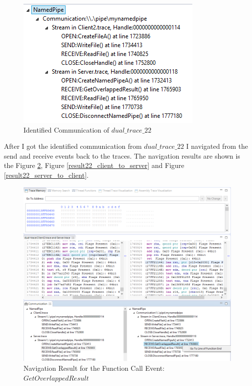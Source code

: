\begin{figure}[H]
\centerline{\includegraphics{Figures/result22_communications}}
 \caption{Identified Communication of $dual\_trace\_22$}
\label{result22_communications}
\end{figure}

After I got the identified communication from $dual\_trace\_22$ I navigated from the send and receive events back to the traces. The navigation results are shown is the Figure \ref{result22_server_readnull}, Figure \ref{result22_client_to_server} and Figure \ref{result22_server_to_client}.

\begin{figure}[H]
\centerline{\includegraphics[scale=0.35]{Figures/result22_server_readnull}}
 \caption{Navigation Result for the Function Call Event: $GetOverlappedResult$}
\label{result22_server_readnull}
\end{figure}


